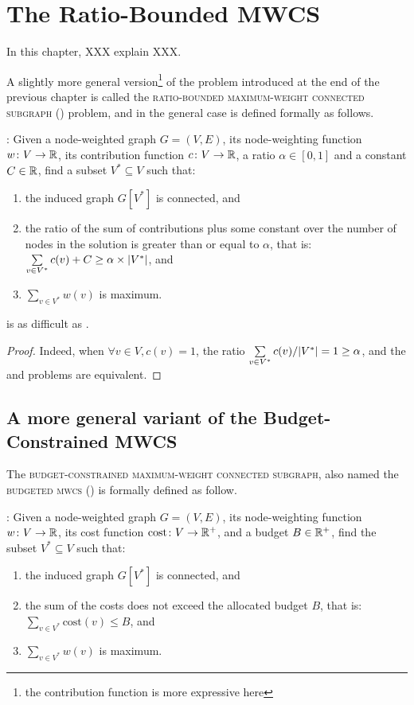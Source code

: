 \chapter{The Ratio-Bounded MWCS}
\label{chap:rbmwcs}

	In this chapter, XXX explain XXX.

	A slightly more general version\footnote{the contribution function is more expressive here} of the problem introduced at the end of the previous chapter is called the \textsc{ratio-bounded maximum-weight connected subgraph} (\rbmwcs) problem, and in the general case is defined formally as follows.

	\textbf{\rbmwcs{}}: Given a node-weighted graph $G = (V, E)$, its node-weighting function $w\colon V \to \mathbb{R}$, its contribution function $c\colon V \to \mathbb{R}$, a ratio $\alpha \in [0,1]$ and a constant $C \in \mathbb{R}$, find a subset $V^* \subseteq V$ such that:
	\begin{enumerate}
		\item the induced graph $G\left[V^*\right]$ is connected, and
		\item the ratio of the sum of contributions plus some constant over the number of nodes in the solution is greater than or equal to $\alpha$, that is:\\
			$\sum\limits_{v \in V^*}{c(v)} + C \geq \alpha\times\lvert V^*\rvert$, and
		\item $\sum\limits_{v \in V^*}{w(v)}$ is maximum.
	\end{enumerate}

	\begin{proposition}
		\rbmwcs{} is as difficult as \mwcs{}.
	\end{proposition}
	\begin{proof}
		Indeed, when $\forall v\in V, c(v) = 1$, the ratio $\sum\limits_{v \in V^*}{c(v)} / \lvert V^*\rvert = 1 \geq \alpha$, and the \mwcs{} and \rbmwcs{} problems are equivalent.
	\end{proof}

	\section{A more general variant of the Budget-Constrained MWCS}
		The \textsc{budget-constrained maximum-weight connected subgraph}, also named the \textsc{budgeted mwcs} (\bcmwcs{}) is formally defined as follow.
		
		\textbf{\bcmwcs{}}: Given a node-weighted graph $G = (V, E)$, its node-weighting function $w\colon V \to \mathbb{R}$, its cost function $\text{cost}\colon V \to \mathbb{R}^+$, and a budget $B \in \mathbb{R}^+$, find the subset $V^* \subseteq V$ such that:
		\begin{enumerate}
			\item the induced graph $G\left[V^*\right]$ is connected, and
			\item the sum of the costs does not exceed the allocated budget $B$, that is:\\
				$\sum\limits_{v \in V^*}{\text{cost}(v)} \leq B$, and
			\item $\sum\limits_{v \in V^*}{w(v)}$ is maximum.
		\end{enumerate}


